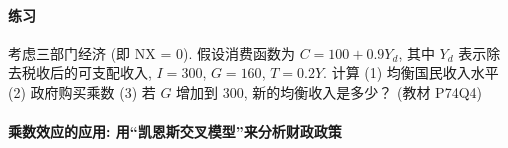 \documentclass[11pt]{ctexart}
\begin{document}
\begin{framed}
\paragraph{练习} 考虑三部门经济  (即 NX = 0).
假设消费函数为 $C = 100 + 0.9 Y_d$, 其中 $Y_d$ 表示除去税收后的可支配收入, $I=300$, $G=160$, $T=0.2Y$.
计算 (1) 均衡国民收入水平 (2) 政府购买乘数  (3) 若 $G$ 增加到 300, 新的均衡收入是多少？  \hfill  (教材 P74Q4)
\end{framed}

\clearpage

\paragraph{乘数效应的应用: 用``凯恩斯交叉模型''来分析财政政策}
\end{document}
